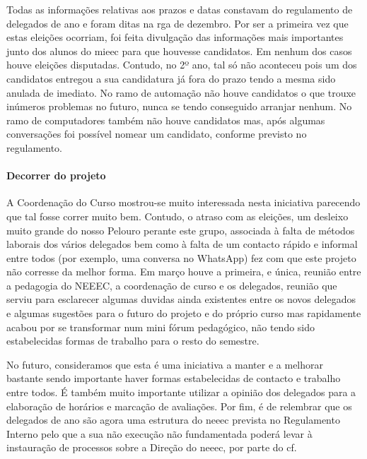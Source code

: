 Todas as informações relativas aos prazos e datas constavam do regulamento de delegados de ano e foram ditas na \acrshort{rga} de dezembro. Por ser a primeira vez que estas eleições ocorriam, foi feita divulgação das informações mais importantes junto dos alunos do \acrshort{mieec} para que houvesse candidatos. Em nenhum dos casos houve eleições disputadas. Contudo, no 2º ano, tal só não aconteceu pois um dos candidatos entregou a sua candidatura já fora do prazo tendo a mesma sido anulada de imediato. No ramo de automação não houve candidatos o que trouxe inúmeros problemas no futuro, nunca se tendo conseguido arranjar nenhum. No ramo de computadores também não houve candidatos mas, após algumas conversações foi possível nomear um candidato, conforme previsto no regulamento.

\paragraph{Decorrer do projeto}

A Coordenação do Curso mostrou-se muito interessada nesta iniciativa parecendo que tal fosse correr muito bem. Contudo, o atraso com as eleições, um desleixo muito grande do nosso Pelouro perante este grupo, associada à falta de métodos laborais dos vários delegados bem como à falta de um contacto rápido e informal entre todos (por exemplo, uma conversa no WhatsApp) fez com que este projeto não corresse da melhor forma. Em março houve a primeira, e única, reunião entre a pedagogia do NEEEC, a coordenação de curso e os delegados, reunião que serviu para esclarecer algumas duvidas ainda existentes entre os novos delegados e algumas sugestões para o futuro do projeto e do próprio curso mas rapidamente acabou por se transformar num mini fórum pedagógico, não tendo sido estabelecidas formas de trabalho para o resto do semestre.

No futuro, consideramos que esta é uma iniciativa a manter e a melhorar bastante sendo importante haver formas estabelecidas de contacto e trabalho entre todos. É também muito importante utilizar a opinião dos delegados para a elaboração de horários e marcação de avaliações. Por fim, é de relembrar que os delegados de ano são agora uma estrutura do \acrshort{neeec} prevista no Regulamento Interno pelo que a sua não execução não fundamentada poderá levar à instauração de processos sobre a Direção do \acrshort{neeec}, por parte do \acrshort{cf}.

